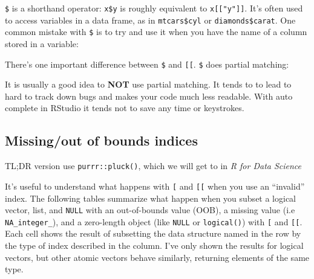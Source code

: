 \documentclass[]{book}
\newenvironment{Shaded}{\begin{snugshade}}{\end{snugshade}}
\newcommand{\KeywordTok}[1]{\textcolor[rgb]{0.13,0.29,0.53}{\textbf{#1}}}
\newcommand{\DataTypeTok}[1]{\textcolor[rgb]{0.13,0.29,0.53}{#1}}
\newcommand{\DecValTok}[1]{\textcolor[rgb]{0.00,0.00,0.81}{#1}}
\newcommand{\StringTok}[1]{\textcolor[rgb]{0.31,0.60,0.02}{#1}}
\newcommand{\CommentTok}[1]{\textcolor[rgb]{0.56,0.35,0.01}{\textit{#1}}}
\newcommand{\OperatorTok}[1]{\textcolor[rgb]{0.81,0.36,0.00}{\textbf{#1}}}
\newcommand{\NormalTok}[1]{#1}
\theoremstyle{definition}
\theoremstyle{definition}
\theoremstyle{definition}
\theoremstyle{remark}
\begin{document}
\texttt{\$} is a shorthand operator: \texttt{x\$y} is roughly equivalent
to \texttt{x{[}{[}"y"{]}{]}}. It's often used to access variables in a
data frame, as in \texttt{mtcars\$cyl} or \texttt{diamonds\$carat}. One
common mistake with \texttt{\$} is to try and use it when you have the
name of a column stored in a variable:

\begin{Shaded}
\begin{Highlighting}[]
\NormalTok{var <-}\StringTok{ "cyl"}
\CommentTok{# Doesn't work - mtcars$var translated to mtcars[["var"]]}
\NormalTok{mtcars}\OperatorTok{$}\NormalTok{var}
\CommentTok{#> NULL}

\CommentTok{# Instead use [[}
\NormalTok{mtcars[[var]]}
\CommentTok{#>  [1] 6 6 4 6 8 6 8 4 4 6 6 8 8 8 8 8 8 4 4 4 4 8 8 8 8 4 4 4 8 6 8 4}
\end{Highlighting}
\end{Shaded}

There's one important difference between \texttt{\$} and
\texttt{{[}{[}}. \texttt{\$} does partial matching:

\begin{Shaded}
\end{Shaded}

It is usually a good idea to \textbf{NOT} use partial matching. It tends
to to lead to hard to track down bugs and makes your code much less
readable. With auto complete in RStudio it tends not to save any time or
keystrokes.

\subsection{Missing/out of bounds
indices}\label{missingout-of-bounds-indices}

TL;DR version use \texttt{purrr::pluck()}, which we will get to in
\emph{R for Data Science}

It's useful to understand what happens with \texttt{{[}} and
\texttt{{[}{[}} when you use an ``invalid'' index. The following tables
summarize what happen when you subset a logical vector, list, and
\texttt{NULL} with an out-of-bounds value (OOB), a missing value (i.e
\texttt{NA\_integer\_}), and a zero-length object (like \texttt{NULL} or
\texttt{logical()}) with \texttt{{[}} and \texttt{{[}{[}}. Each cell
shows the result of subsetting the data structure named in the row by
the type of index described in the column. I've only shown the results
for logical vectors, but other atomic vectors behave similarly,
returning elements of the same type.
\end{document}
